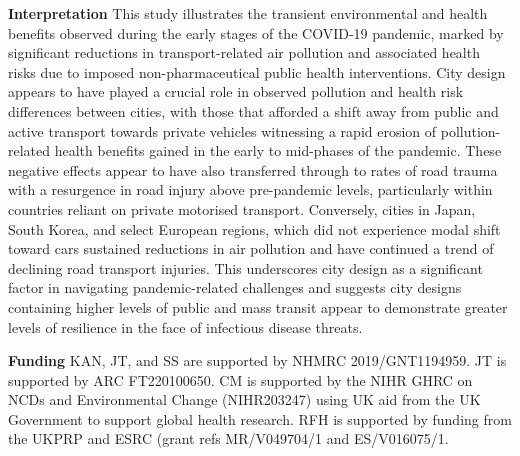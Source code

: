 \documentclass[preprint,10pt]{elsarticle} %
\newcommand{\absdiv}[1]{%
  \par\addvspace{.5\baselineskip}%
  \noindent\textbf{#1}\quad\ignorespaces}
\begin{document}
 \absdiv{\textcolor{OliveGreen}{Interpretation}}
This study illustrates the transient environmental and health benefits observed during the early stages of the COVID-19 pandemic, marked by significant reductions in transport-related air pollution and associated health risks due to imposed non-pharmaceutical public health interventions. City design appears to have played a crucial role in observed pollution and health risk differences between cities, with those that afforded a shift away from public and active transport towards private vehicles witnessing a rapid erosion of pollution-related health benefits gained in the early to mid-phases of the pandemic. These negative effects appear to have also transferred through to rates of road trauma with a resurgence in road injury above pre-pandemic levels, particularly within countries reliant on private motorised transport. Conversely, cities in Japan, South Korea, and select European regions, which did not experience modal shift toward cars sustained reductions in air pollution and have continued a trend of declining road transport injuries. This underscores city design as a significant factor in navigating pandemic-related challenges and suggests city designs containing higher levels of public and mass transit appear to demonstrate greater levels of resilience in the face of infectious disease threats. 
 \absdiv{\textcolor{OliveGreen}{Funding}}
 KAN, JT, and SS are supported by NHMRC 2019/GNT1194959. JT is supported by ARC FT220100650. CM is supported by the NIHR GHRC on NCDs and Environmental Change (NIHR203247) using UK aid from the UK Government to support global health research. RFH is supported by funding from the UKPRP and ESRC (grant refs MR/V049704/1 and ES/V016075/1.
\end{document}
